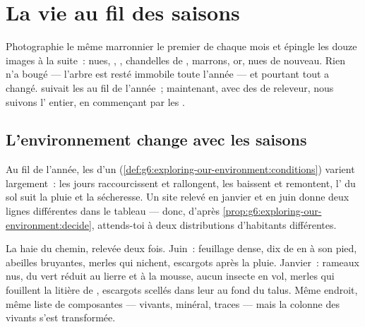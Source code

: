 \chapter{La vie au fil des saisons}\label{ch:g6:life-through-seasons}

Photographie le même marronnier le premier de chaque mois et
épingle les douze images à la suite~:  nues, ,
, chandelles de , marrons, or,  nues de
nouveau. Rien n'a bougé --- l'arbre est resté immobile toute
l'année --- et pourtant tout a changé.
 suivait les  au fil de
l'année~; maintenant, avec des  de releveur, nous suivons
l' entier, en commençant par les .

\section{L'environnement change avec les saisons}

\begin{proposition}\label{prop:g6:life-through-seasons:conditions}
Au fil de l'année, les  d'un 
(\cref{def:g6:exploring-our-environment:conditions}) varient
largement~: les jours raccourcissent et rallongent, les 
baissent et remontent, l' du sol suit la pluie et la
sécheresse. Un site relevé en janvier et en juin donne deux lignes
différentes dans le tableau --- donc, d'après
\cref{prop:g6:exploring-our-environment:decide}, attends-toi à deux
distributions d'habitants différentes.
\end{proposition}
\admitted

\begin{example}\label{ex:g6:life-through-seasons:hedge}
La haie du chemin, relevée deux fois. Juin~: feuillage dense, dix
 de  en  à son pied, abeilles bruyantes, merles
qui nichent, escargots après la pluie. Janvier~: rameaux nus, du
vert réduit au lierre et à la mousse, aucun insecte en vol, merles
qui fouillent la litière de , escargots scellés dans leur
 au fond du talus. Même endroit, même liste de composantes
--- vivants, minéral, traces --- mais la colonne des vivants s'est
transformée.
\end{example}

